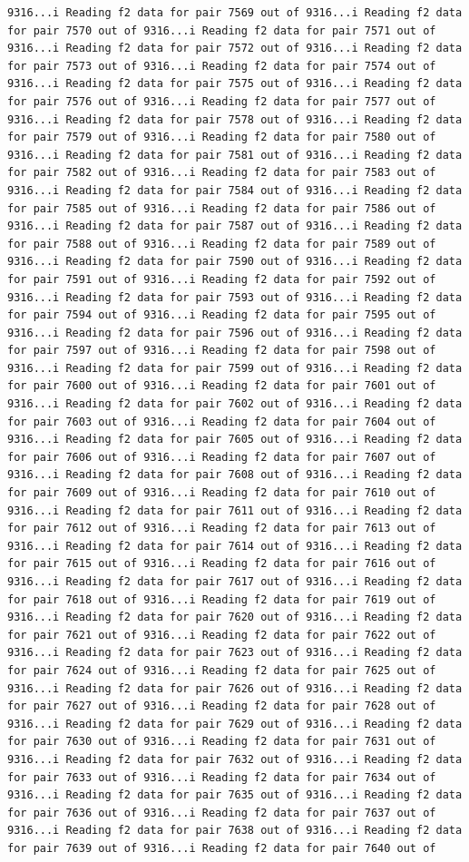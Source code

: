 \documentclass[
]{article}
\begin{document}
\begin{verbatim}
9316...i Reading f2 data for pair 7569 out of 9316...i Reading f2 data for pair 7570 out of 9316...i Reading f2 data for pair 7571 out of 9316...i Reading f2 data for pair 7572 out of 9316...i Reading f2 data for pair 7573 out of 9316...i Reading f2 data for pair 7574 out of 9316...i Reading f2 data for pair 7575 out of 9316...i Reading f2 data for pair 7576 out of 9316...i Reading f2 data for pair 7577 out of 9316...i Reading f2 data for pair 7578 out of 9316...i Reading f2 data for pair 7579 out of 9316...i Reading f2 data for pair 7580 out of 9316...i Reading f2 data for pair 7581 out of 9316...i Reading f2 data for pair 7582 out of 9316...i Reading f2 data for pair 7583 out of 9316...i Reading f2 data for pair 7584 out of 9316...i Reading f2 data for pair 7585 out of 9316...i Reading f2 data for pair 7586 out of 9316...i Reading f2 data for pair 7587 out of 9316...i Reading f2 data for pair 7588 out of 9316...i Reading f2 data for pair 7589 out of 9316...i Reading f2 data for pair 7590 out of 9316...i Reading f2 data for pair 7591 out of 9316...i Reading f2 data for pair 7592 out of 9316...i Reading f2 data for pair 7593 out of 9316...i Reading f2 data for pair 7594 out of 9316...i Reading f2 data for pair 7595 out of 9316...i Reading f2 data for pair 7596 out of 9316...i Reading f2 data for pair 7597 out of 9316...i Reading f2 data for pair 7598 out of 9316...i Reading f2 data for pair 7599 out of 9316...i Reading f2 data for pair 7600 out of 9316...i Reading f2 data for pair 7601 out of 9316...i Reading f2 data for pair 7602 out of 9316...i Reading f2 data for pair 7603 out of 9316...i Reading f2 data for pair 7604 out of 9316...i Reading f2 data for pair 7605 out of 9316...i Reading f2 data for pair 7606 out of 9316...i Reading f2 data for pair 7607 out of 9316...i Reading f2 data for pair 7608 out of 9316...i Reading f2 data for pair 7609 out of 9316...i Reading f2 data for pair 7610 out of 9316...i Reading f2 data for pair 7611 out of 9316...i Reading f2 data for pair 7612 out of 9316...i Reading f2 data for pair 7613 out of 9316...i Reading f2 data for pair 7614 out of 9316...i Reading f2 data for pair 7615 out of 9316...i Reading f2 data for pair 7616 out of 9316...i Reading f2 data for pair 7617 out of 9316...i Reading f2 data for pair 7618 out of 9316...i Reading f2 data for pair 7619 out of 9316...i Reading f2 data for pair 7620 out of 9316...i Reading f2 data for pair 7621 out of 9316...i Reading f2 data for pair 7622 out of 9316...i Reading f2 data for pair 7623 out of 9316...i Reading f2 data for pair 7624 out of 9316...i Reading f2 data for pair 7625 out of 9316...i Reading f2 data for pair 7626 out of 9316...i Reading f2 data for pair 7627 out of 9316...i Reading f2 data for pair 7628 out of 9316...i Reading f2 data for pair 7629 out of 9316...i Reading f2 data for pair 7630 out of 9316...i Reading f2 data for pair 7631 out of 9316...i Reading f2 data for pair 7632 out of 9316...i Reading f2 data for pair 7633 out of 9316...i Reading f2 data for pair 7634 out of 9316...i Reading f2 data for pair 7635 out of 9316...i Reading f2 data for pair 7636 out of 9316...i Reading f2 data for pair 7637 out of 9316...i Reading f2 data for pair 7638 out of 9316...i Reading f2 data for pair 7639 out of 9316...i Reading f2 data for pair 7640 out of 
\end{verbatim}
\end{document}

